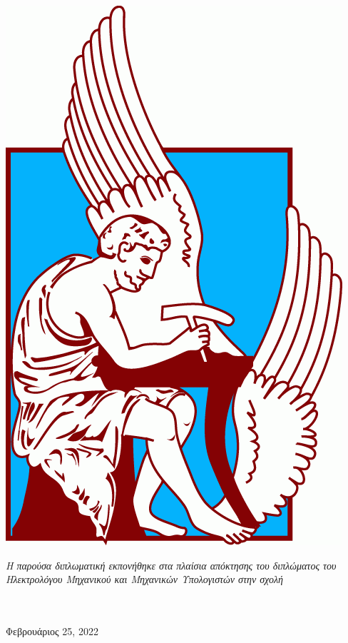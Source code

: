 \documentclass[
	12pt, %
	english, %
	onehalfspacing, %
	liststotoc, %
	toctotoc, %
	parskip, %
	headsepline, %
]{MastersDoctoralThesis} %
\begin{document}
\begin{titlepage}
\begin{center}
		\includegraphics[scale=0.22]{Images/TUC_logo.png} %
		\\[0.5cm]

		\vfill

		\large \textit{Η παρούσα διπλωματική εκπονήθηκε στα πλαίσια απόκτησης του διπλώματος του Ηλεκτρολόγου Μηχανικού και Μηχανικών Υπολογιστών στην σχολή}\\[0.1cm] %
		\deptname\\\groupname\\[0.4cm] %

		\vfill

		{\large Φεβρουάριος 25, 2022 }\\[2cm] %

		\vfill
	\end{center}
\end{titlepage}
\end{document}
